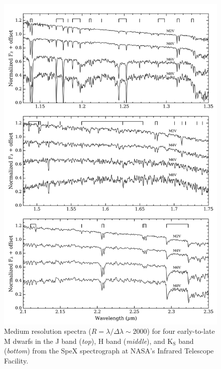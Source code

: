 \begin{figure}
\centering
\includegraphics[width=0.8\hsize]{figures/Mdwarf_spectra.png}
\caption[Near-IR spectra of early-to-late M dwarfs.]
        {Medium resolution spectra ($R=\lambda / \Delta \lambda \sim 2000$)
          for four early-to-late M dwarfs in the J band (\emph{top}),
  H band (\emph{middle}), and K$_{\text{S}}$ band (\emph{bottom}) from the SpeX spectrograph
  at NASA's Infrared Telescope Facility. \label{fig:spectra}}
\end{figure}


